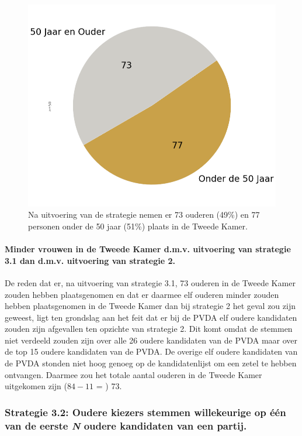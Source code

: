 \begin{figure}[H]
\centering
	\includegraphics[width=0.42\linewidth]{pie_chart_top15_of_topN_ouderen.png}

			\caption{Na uitvoering van de strategie nemen er 73 ouderen (49\%) en 77 personen onder de 50 jaar (51\%) plaats in de Tweede Kamer.}

\label{fig:pcS31O}
\end{figure}

\paragraph{Minder vrouwen in de Tweede Kamer d.m.v. uitvoering van strategie 3.1 dan d.m.v. uitvoering van strategie 2.}
De reden dat er, na uitvoering van strategie 3.1, 73 ouderen in de Tweede Kamer zouden hebben plaatsgenomen en dat er daarmee elf ouderen minder zouden hebben plaatsgenomen in de Tweede Kamer dan bij strategie 2 het geval zou zijn geweest, ligt ten grondslag aan het feit dat er bij de PVDA elf oudere kandidaten zouden zijn afgevallen ten opzichte van strategie 2. Dit komt omdat de stemmen niet verdeeld zouden zijn over alle 26 oudere kandidaten van de PVDA maar over de top 15 oudere kandidaten van de PVDA. De overige elf oudere kandidaten van de PVDA stonden niet hoog genoeg op de kandidatenlijst om een zetel te hebben ontvangen. Daarmee zou het totale aantal ouderen in de Tweede Kamer uitgekomen zijn ($84-11$ = ) 73.






\subsubsection{Strategie 3.2: Oudere kiezers stemmen willekeurige op één van de eerste \textit{N} oudere kandidaten van een partij.}


